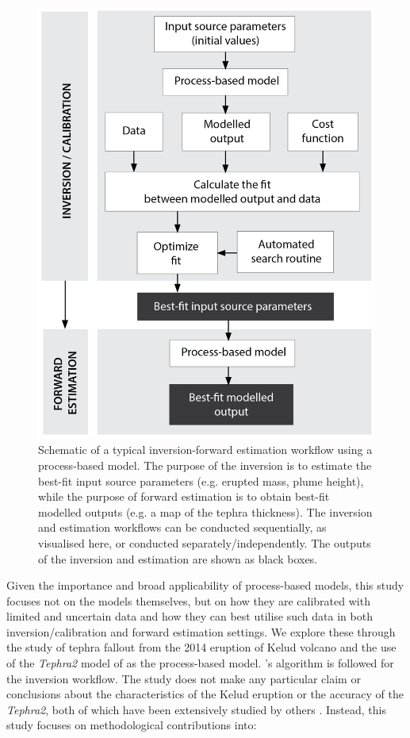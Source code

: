 \begin{figure}[htbp]
\centering
\includegraphics[width=.8\linewidth]{Figures/fig1_schematic.png}
\caption{Schematic of a typical inversion-forward estimation workflow using a process-based model. The purpose of the inversion is to estimate the best-fit input source parameters (e.g. erupted mass, plume height), while the purpose of forward estimation is to obtain best-fit modelled outputs (e.g. a map of the tephra thickness). The inversion and estimation workflows can be conducted sequentially, as visualised here, or conducted separately/independently. The outputs of the inversion and estimation are shown as black boxes.}
\label{fig:schem-typ}
\end{figure}

Given the importance and broad applicability of process-based models, this study focuses not on the models themselves, but on how they are calibrated with limited and uncertain data and how they can best utilise such data in both inversion/calibration and forward estimation settings. We explore these through the study of tephra fallout from the 2014 eruption of Kelud volcano and the use of the \textit{Tephra2} model of \cite{bonadonna2005probabilistic} as the process-based model. \cite{connor2006inversion}'s algorithm is followed for the inversion workflow. The study does not make any particular claim or conclusions about the characteristics of the Kelud eruption or the accuracy of the \textit{Tephra2}, both of which have been extensively studied by others \citep{MAENO201924,caudron2015,HARGIE201981, SUZUKI201942, connor2011tephra2, connor2006inversion}. Instead, this study focuses on methodological contributions into:

